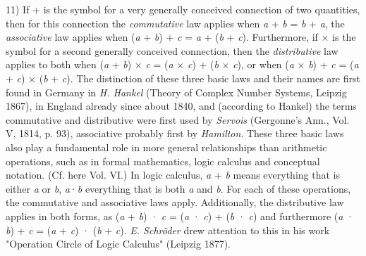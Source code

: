 \vfill
\leftline{\rule{2in}{0.4pt}}
\vspace{0.2cm}
{
\footnotesize
11) If + is the symbol for a very generally conceived connection of two quantities, then for this connection the \textit{commutative} law applies when \textit{a} + \textit{b} = \textit{b} + \textit{a}, the \textit{associative} law applies when (\textit{a} + \textit{b}) + \textit{c} = \textit{a} + (\textit{b} + \textit{c}). Furthermore, if × is the symbol for a second generally conceived connection, then the \textit{distributive} law applies to both when (\textit{a} + \textit{b}) × \textit{c} = (\textit{a} × \textit{c}) + (\textit{b} × \textit{c}), or when (\textit{a} × \textit{b}) + \textit{c} = (\textit{a} + \textit{c}) × (\textit{b} + \textit{c}). The distinction of these three basic laws and their names are first found in Germany in \textit{H. Hankel} (Theory of Complex Number Systems, Leipzig 1867), in England already since about 1840, and (according to Hankel) the terms commutative and distributive were first used by \textit{Servois} (Gergonne's Ann., Vol. V, 1814, p. 93), associative probably first by \textit{Hamilton}. These three basic laws also play a fundamental role in more general relationships than arithmetic operations, such as in formal mathematics, logic calculus and conceptual notation. (Cf. here Vol. VI.) In logic calculus, \textit{a} + \textit{b} means everything that is either \textit{a} or \textit{b}, \textit{a}·\textit{b} everything that is both \textit{a} and \textit{b}. For each of these operations, the commutative and associative laws apply. Additionally, the distributive law applies in both forms, as (\textit{a} + \textit{b}) · \textit{c} = (\textit{a} · \textit{c}) + (\textit{b} · \textit{c}) and furthermore (\textit{a} · \textit{b}) + \textit{c} = (\textit{a} + \textit{c}) · (\textit{b} + \textit{c}). \textit{E. Schröder} drew attention to this in his work "Operation Circle of Logic Calculus" (Leipzig 1877).

}
